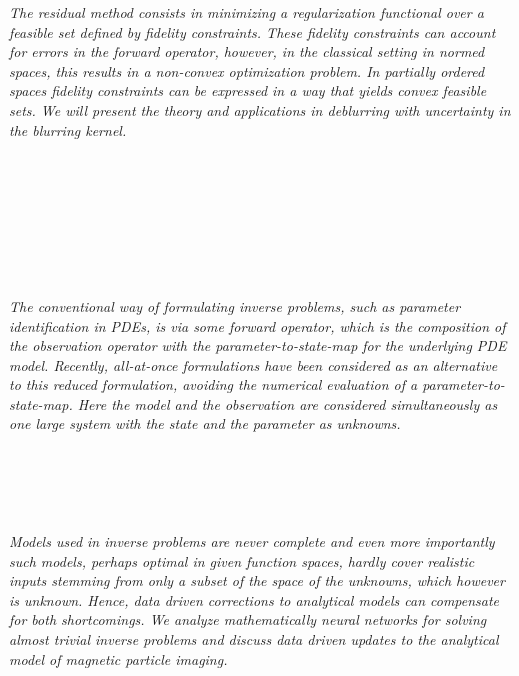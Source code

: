   \begin{multicols}{2}
      \textit{The residual method consists in minimizing a regularization functional over a feasible set defined by fidelity constraints. These fidelity constraints can account for errors in the forward operator, however, in the classical setting in normed spaces, this results in a non-convex optimization problem. In partially ordered spaces fidelity constraints can be expressed in a way that yields convex feasible sets. We will present the theory and applications in deblurring with uncertainty in the blurring kernel.}\\
\\ 
        \\
        \\\\
        \\
        \\\\
\\
      \textit{The conventional way of formulating inverse problems, such as parameter identification in PDEs, is via some forward operator, which is the composition of the observation operator with the parameter-to-state-map for the underlying PDE model. Recently, all-at-once formulations have been considered as an alternative to this reduced formulation, avoiding the numerical evaluation of a parameter-to-state-map. Here the model and the observation are considered simultaneously as one large system with the state and the parameter as unknowns.}\\
\\ 
        \\
        \\\\
\\
      \textit{Models used in inverse problems are never complete and even more importantly such models, perhaps optimal in given function spaces, hardly cover realistic inputs stemming from only a subset of the space of the unknowns, which however is unknown. Hence, data driven corrections to analytical models can compensate for both shortcomings.
We analyze mathematically neural networks for solving almost trivial inverse problems and discuss data driven updates to the analytical model of magnetic particle imaging.}\\
\\ 

\end{multicols}
